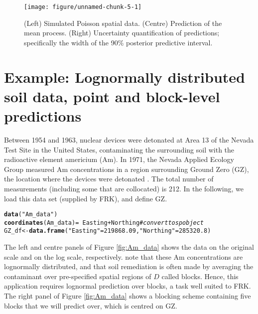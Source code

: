 \documentclass{article}\usepackage[]{graphicx}\usepackage[]{color}
\makeatletter
\def\maxwidth{ %
  \ifdim\Gin@nat@width>\linewidth
    \linewidth
  \else
    \Gin@nat@width
  \fi
}
\newcommand{\hlnum}[1]{\textcolor[rgb]{0.686,0.059,0.569}{#1}}%
\newcommand{\hlstr}[1]{\textcolor[rgb]{0.192,0.494,0.8}{#1}}%
\newcommand{\hlcom}[1]{\textcolor[rgb]{0.678,0.584,0.686}{\textit{#1}}}%
\newcommand{\hlopt}[1]{\textcolor[rgb]{0,0,0}{#1}}%
\newcommand{\hlstd}[1]{\textcolor[rgb]{0.345,0.345,0.345}{#1}}%
\newcommand{\hlkwb}[1]{\textcolor[rgb]{0.69,0.353,0.396}{#1}}%
\newcommand{\hlkwd}[1]{\textcolor[rgb]{0.737,0.353,0.396}{\textbf{#1}}}%
\newenvironment{kframe}{%
 \def\at@end@of@kframe{}%
 \ifinner\ifhmode%
  \def\at@end@of@kframe{\end{minipage}}%
  \begin{minipage}{\columnwidth}%
 \fi\fi%
 \def\FrameCommand##1{\hskip\@totalleftmargin \hskip-\fboxsep
 \colorbox{shadecolor}{##1}\hskip-\fboxsep
     \hskip-\linewidth \hskip-\@totalleftmargin \hskip\columnwidth}%
 \MakeFramed {\advance\hsize-\width
   \@totalleftmargin\z@ \linewidth\hsize
   \@setminipage}}%
 {\par\unskip\endMakeFramed%
 \at@end@of@kframe}
\newenvironment{knitrout}{}{} %
\newcommand{\pkg}[1]{{\fontseries{b}\selectfont #1}}
\makeatother
\begin{document}
\begin{knitrout}
\color{fgcolor}\begin{figure}

{\centering \texttt{[image: figure/unnamed-chunk-5-1]} 

}

\caption{(Left) Simulated Poisson spatial data. (Centre) Prediction of the mean process. (Right) Uncertainty quantification of predictions; specifically the width of the 90\% posterior predictive interval.\label{fig:example1}}\label{fig:unnamed-chunk-5}
\end{figure}


\end{knitrout}


\section{Example: Lognormally distributed soil data, point and block-level predictions}\label{sec:Americium}

Between 1954 and 1963, nuclear devices were detonated at Area 13 of the Nevada Test Site in the United States, contaminating the surrounding soil with the radioactive element americium (Am). 
In 1971, the Nevada Applied Ecology Group measured Am concentrations in a region surrounding Ground Zero (GZ), the location where the devices were detonated \citep{Paul_Cressie_2011_lognormal_kriging_block_prediction}. 
The total number of measurements (including some that are collocated) is 212.
 In the following, we load this data set (supplied by \pkg{FRK}), and define GZ. 

\begin{knitrout}
\color{fgcolor}\begin{kframe}
\begin{alltt}
\hlkwd{data}\hlstd{(}\hlstr{"Am_data"}\hlstd{)}
\hlkwd{coordinates}\hlstd{(Am_data)} \hlkwb{=} \hlopt{~} \hlstd{Easting} \hlopt{+} \hlstd{Northing} \hlcom{# convert to sp object}
\hlstd{GZ_df} \hlkwb{<-} \hlkwd{data.frame}\hlstd{(}\hlstr{"Easting"} \hlstd{=} \hlnum{219868.09}\hlstd{,} \hlstr{"Northing"} \hlstd{=} \hlnum{285320.8}\hlstd{)}
\end{alltt}
\end{kframe}
\end{knitrout}

The left and centre panels of Figure \ref{fig:Am_data} shows the data on the original scale and on the log scale, respectively.
\cite{Paul_Cressie_2011_lognormal_kriging_block_prediction} note that these Am concentrations are lognormally distributed, and that soil remediation is often made by averaging the contaminant over pre-specified spatial regions of $D$ called blocks.
Hence, this application requires lognormal prediction over blocks, a task well suited to \pkg{FRK}. 
 The right panel of Figure \ref{fig:Am_data} shows a blocking scheme containing five blocks that we will predict over, which is centred on GZ.
 
\end{document}
